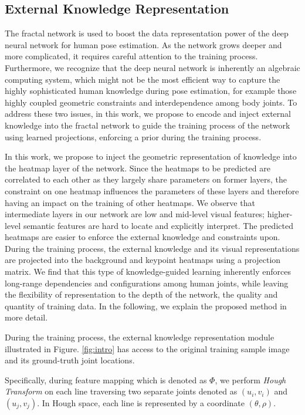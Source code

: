 \documentclass[journal ]{IEEEtran}
\begin{document}
\subsection{External Knowledge Representation}
\label{sec:guided-learning}

The fractal network is used to boost the data representation power of the deep neural network for human pose estimation. As the network grows deeper and more complicated, it requires careful attention to the training process. Furthermore, we recognize that the deep neural network is inherently an algebraic computing system, which might not be the most efficient way to capture the highly sophisticated human knowledge during pose estimation, for example those highly coupled geometric constraints and interdependence among body joints. To address these two issues, in this work, we propose to encode and inject external knowledge into the fractal network to guide the training process of the network using learned projections, enforcing a prior during the training process.

In this work, we propose to inject the geometric representation of knowledge into the heatmap layer of the network. 
Since the heatmaps to be predicted are correlated to each other as they largely share parameters on former layers, the constraint on one heatmap influences the parameters of these layers and therefore having an impact on the training of other heatmaps. We observe that intermediate layers in our network are low and mid-level visual features; higher-level semantic features are hard to locate and explicitly interpret. 
The predicted heatmaps are easier to enforce the external knowledge and constraints upon. 
During the training process, the external knowledge and its visual representations are projected into the background and keypoint heatmaps using a projection matrix. We find that this type of knowledge-guided learning inherently enforces long-range dependencies and configurations among human joints, while leaving the flexibility of representation to the depth of the network, the quality and quantity of training data. In the following, we explain the proposed method in more detail.

During the training process, the external knowledge representation module illustrated in Figure. \ref{fig:intro} has access to the original training sample image and its ground-truth joint locations.

Specifically, during feature mapping which is denoted as $\Phi$, we perform \textit{Hough Transform} on each line traversing two separate joints denoted as $(u_{i}, v_{i})$ and $(u_{j}, v_{j})$. In Hough space, each line is represented by a coordinate $(\theta, \rho)$.
\end{document}
